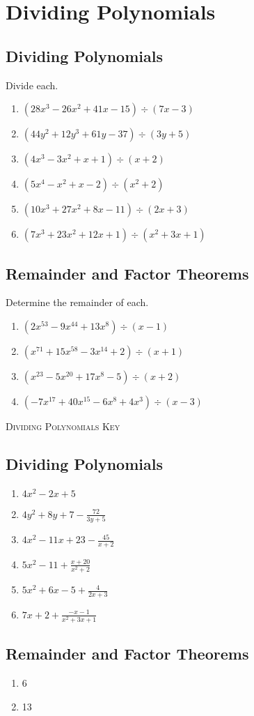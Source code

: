 \chapter{Dividing Polynomials}

\section{Dividing Polynomials}

Divide each.
\begin{enumerate}
    \item $(28x^3-26x^2+41x-15) \div (7x-3)$
    \item $(44y^2+12y^3+61y-37) \div (3y+5)$
    \item $\left(4x^3 - 3x^2 + x + 1\right) \div (x + 2)$
    \item $\left(5x^4 - x^2 + x - 2\right) \div (x^2 + 2)$
    \item $\left(10x^3 + 27x^2 + 8x - 11\right) \div (2x+3)$
	\item $\left(7x^3 + 23x^2 + 12x + 1\right) \div \left(x^2+3x+1\right)$
\end{enumerate}

\section{Remainder and Factor Theorems}

Determine the remainder of each.
\begin{enumerate}
	\item $\left(2x^{53} - 9x^{44} + 13x^8\right) \div (x - 1)$
	\item $\left(x^{71} + 15x^{58} - 3x^{14} + 2\right) \div (x + 1)$
	\item $\left(x^{23}-5x^{20}+17x^8-5\right) \div (x+2)$
	\item $\left(-7x^{17} + 40x^{15} - 6x^8 + 4x^3\right) \div (x-3)$
\end{enumerate}

\newpage

\textsc{Dividing Polynomials Key}

\section*{Dividing Polynomials}

\begin{enumerate}
    \item $4x^2-2x+5$
    \item $4y^2+8y+7-\frac{72}{3y+5}$
    \item $4x^2 - 11x + 23 - \frac{45}{x+2}$
    \item $5x^2 - 11 + \frac{x+20}{x^2+2}$
    \item $5x^2 + 6x - 5 + \frac{4}{2x+3}$
    \item $7x + 2 + \frac{-x-1}{x^2+3x+1}$
\end{enumerate}

\section*{Remainder and Factor Theorems}

\begin{enumerate}
	\item 6
	\item 13
\end{enumerate}